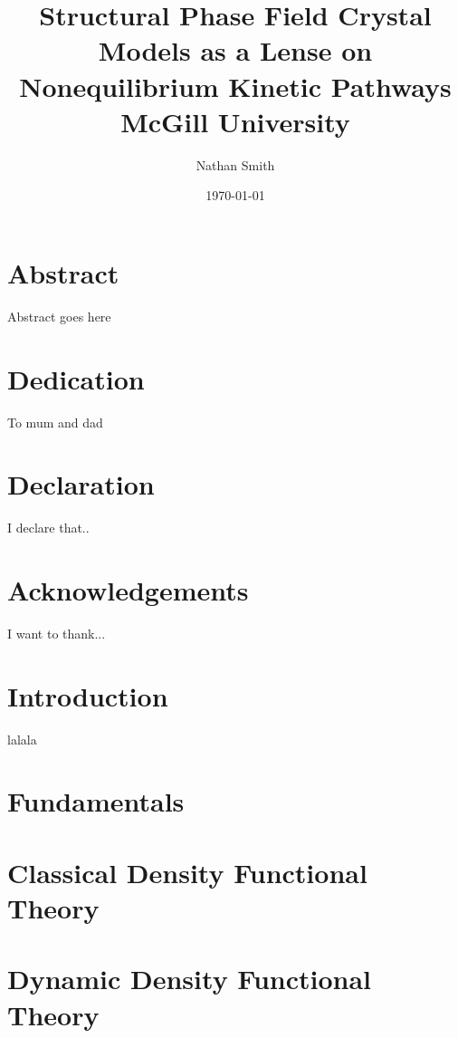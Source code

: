 \documentclass[11pt, letterpaper, twoside, openright]{book}
\title{
	{Structural Phase Field Crystal Models as a Lense on Nonequilibrium Kinetic Pathways}\\
	{\large McGill University}\\
}
\author{Nathan Smith}
\date{\today}
\begin{document}
\maketitle

\chapter*{Abstract}
Abstract goes here

\chapter*{Dedication}
To mum and dad

\chapter*{Declaration}
I declare that..

\chapter*{Acknowledgements}
I want to thank...

\tableofcontents

\chapter{Introduction}
lalala

\chapter{Fundamentals}
\begin{refsection}

\printbibliography
\end{refsection}

\chapter{Classical Density Functional Theory}
\begin{refsection}

\printbibliography
\end{refsection}

\chapter{Dynamic Density Functional Theory}


\appendix
\end{document}
